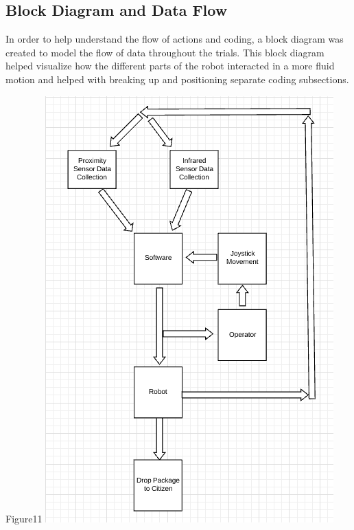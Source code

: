 \documentclass{article}
\begin{document}
\subsection{Block Diagram and Data Flow}
    In order to help understand the flow of actions and coding, a block diagram was created to model the flow of data throughout the trials. This block diagram helped visualize how the different parts of the robot interacted in a more fluid motion and helped with breaking up and positioning separate coding subsections.
     \begin{center}{Figure11 \includegraphics[]{DataFlow.png}}\end{center}
     
\end{document}
